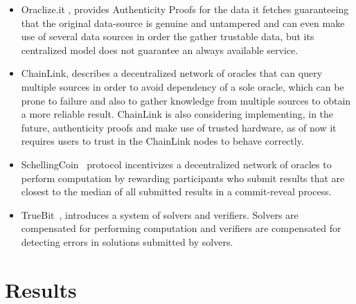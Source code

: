 \documentclass[final,3p,12pt,twocolumn]{elsarticle}
\begin{document}
\begin{itemize}
  \item Oraclize.it \cite{Oraclize.it2018}, provides Authenticity Proofs for the data it fetches guaranteeing that the original data-source is genuine and untampered and can even make use of several data sources in order the gather trustable data, but its centralized model does not guarantee an always available service.
  \item ChainLink\cite{Ellis2017}, describes a decentralized network of oracles that can query multiple sources in order to avoid dependency of a sole oracle, which can be prone to failure and also to gather knowledge from multiple sources to obtain a more reliable result. ChainLink is also considering implementing, in the future, authenticity proofs and make use of trusted hardware, as of now it requires users to trust in the ChainLink nodes to behave correctly.
  \item SchellingCoin~\cite{VitalikButerin2014} protocol incentivizes a decentralized network of oracles to perform computation by rewarding participants who submit results that are closest to the median of all submitted results in a commit-reveal process.
  \item TrueBit~\cite{Teutsch2017}, introduces a system of solvers and verifiers. Solvers are compensated for performing computation and verifiers are compensated for detecting errors in solutions submitted by solvers.
\end{itemize}

\section{Results}\label{sec:5}
\end{document}
